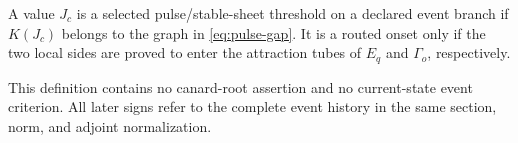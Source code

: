 \begin{definition}
A value \(J_c\) is a selected pulse/stable-sheet threshold on a declared
event branch if \(K(J_c)\) belongs to the graph in
\cref{eq:pulse-gap}.  It is a routed onset only if the two local sides are
proved to enter the attraction tubes of \(E_q\) and \(\Gamma_o\), respectively.
\end{definition}

This definition contains no canard-root assertion and no current-state event
criterion.  All later signs refer to the complete event history in the same
section, norm, and adjoint normalization.

